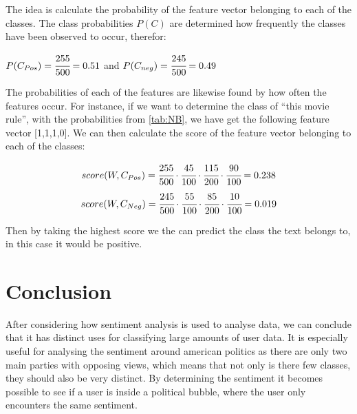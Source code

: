 The idea is calculate the probability of the feature vector belonging to each of
the classes. The class probabilities $P(C)$ are determined how frequently the classes have
been observed to occur, therefor:
\begin{center}
$P(C_{Pos}) = \cfrac{255}{500} = 0.51 $ and $P(C_{neg}) = \cfrac{245}{500} =
0.49 $
\end{center}
The probabilities of each of the features are likewise found by how often the
features occur. For instance, if we want to determine the class of ``this
movie rule'', with the probabilities from \autoref{tab:NB}, we have get the
following feature vector [1,1,1,0]. We can then calculate the score of
the feature vector belonging to each of the classes:

\begin{equation}\label{e:Pos}
score(W, C_{Pos}) = \cfrac{255}{500} \cdot \cfrac{45}{100} \cdot
\cfrac{115}{200} \cdot \cfrac{90}{100} = 0.238
\end{equation}
\begin{equation}\label{e:Neg}
score(W, C_{Neg}) = \cfrac{245}{500} \cdot \cfrac{55}{100} \cdot \cfrac{85}{200}
\cdot \cfrac{10}{100} = 0.019
\end{equation}

Then by taking the highest score we the can predict the class the text belongs
to, in this case it would be positive.

\section{Conclusion}\label{sec:DAConc}
After considering how sentiment analysis is used to analyse data, we can
conclude that it has distinct uses for classifying large amounts of user data.
It is especially useful for analysing the sentiment around american politics as
there are only two main parties with opposing views, which means that not only
is there few classes, they should also be very distinct. By determining the
sentiment it becomes possible to see if a user is inside a political bubble,
where the user only encounters the same sentiment.



